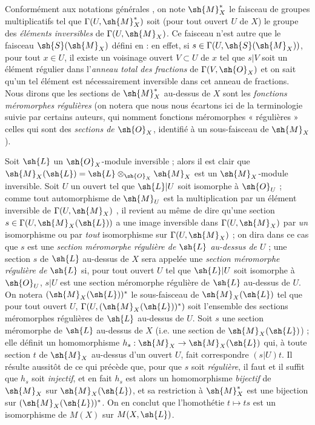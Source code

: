 \begin{env}[20.1.8]
Conformément aux notations générales , on note $\sh{M}_X^*$ le faisceau de groupes multiplicatifs tel que $\Gamma(U,\sh{M}_X^*)$ soit (pour tout ouvert $U$ de $X$) le groupe des \emph{éléments inversibles} de $\Gamma(U,\sh{M}_X)$.
Ce faisceau n'est autre que le faisceau $\sh{S}(\sh{M}_X)$ défini en  : en effet, si $s\in\Gamma(U,\sh{S}(\sh{M}_X))$, pour tout $x\in U$, il existe un voisinage ouvert $V\subset U$ de $x$ tel que $s|V$ soit un élément régulier dans l'\emph{anneau total des fractions} de $\Gamma(V,\sh{O}_X)$ et on sait qu'un tel élément est nécessairement inversible dans cet anneau de fractions.
Nous dirons que les sections de $\sh{M}_X^*$ au-dessus de $X$ sont les \emph{fonctions méromorphes régulières} (on notera que nous nous écartons ici de la terminologie suivie par certains auteurs, qui nomment fonctions méromorphes « régulières » celles qui sont des \emph{sections de $\sh{O}_X$}, identifié à un sous-faisceau de $\sh{M}_X$).

Soit $\sh{L}$ un $\sh{O}_X$-module inversible  ; alors il est clair que $\sh{M}_X(\sh{L})=\sh{L}\otimes_{\sh{O}_X}\sh{M}_X$
est un $\sh{M}_X$-module inversible.
Soit $U$ un ouvert tel que $\sh{L}|U$ soit isomorphe à $\sh{O}_U$ ; comme tout automorphisme de $\sh{M}_U$ est la multiplication par un élément inversible de $\Gamma(U,\sh{M}_X)$ , il revient au même de dire qu'une section $s\in\Gamma(U,\sh{M}_X(\sh{L}))$ a une image inversible dans $\Gamma(U,\sh{M}_X)$ par \emph{un} isomorphisme ou par \emph{tout} isomorphisme sur $\Gamma(U,\sh{M}_X)$ ; on dira dans ce cas que $s$ est une \emph{section méromorphe régulière de $\sh{L}$ au-dessus de $U$} ; une section $s$ de $\sh{L}$ au-dessus de $X$ sera appelée une \emph{section méromorphe régulière de $\sh{L}$} si, pour tout ouvert $U$ tel que $\sh{L}|U$ soit isomorphe à $\sh{O}_U$, $s|U$ est une section méromorphe régulière de $\sh{L}$ au-dessus de $U$.
On notera $(\sh{M}_X(\sh{L}))^*$ le sous-faisceau de $\sh{M}_X(\sh{L})$ tel que pour tout ouvert $U$, $\Gamma(U,(\sh{M}_X(\sh{L}))^*)$ soit l'ensemble des sections méromorphes régulières de $\sh{L}$ au-dessus de $U$.
Soit $s$ une section méromorphe de $\sh{L}$ au-dessus de $X$ (i.e. une section de $\sh{M}_X(\sh{L})$) ; elle définit un homomorphisme $h_s:\sh{M}_X\to\sh{M}_X(\sh{L})$ qui, à toute section $t$ de $\sh{M}_X$ au-dessus d'un ouvert $U$, fait correspondre $(s|U)t$.
Il résulte aussitôt de ce qui précède que, pour que $s$ soit \emph{régulière}, il faut et il suffit que $h_s$ soit \emph{injectif}, et en fait $h_s$ est alors un homomorphisme \emph{bijectif} de $\sh{M}_X$ sur $\sh{M}_X(\sh{L})$, et sa restriction à $\sh{M}_X^*$ est une bijection sur $(\sh{M}_X(\sh{L}))^*$.
On en conclut que l'homothétie $t\mapsto ts$ est un isomorphisme de $M(X)$ sur $M(X,\sh{L})$.
\end{env}

